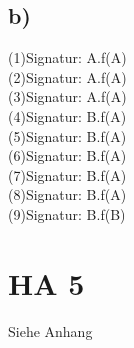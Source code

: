 \documentclass[a4paper]{article}
\begin{document}
\subsection*{b)}
(1)Signatur: A.f(A)\\
(2)Signatur: A.f(A)\\
(3)Signatur: A.f(A)\\
(4)Signatur: B.f(A)\\
(5)Signatur: B.f(A)\\
(6)Signatur: B.f(A)\\
(7)Signatur: B.f(A)\\
(8)Signatur: B.f(A)\\
(9)Signatur: B.f(B)\\




\section*{ HA 5 }

Siehe Anhang
\end{document}
